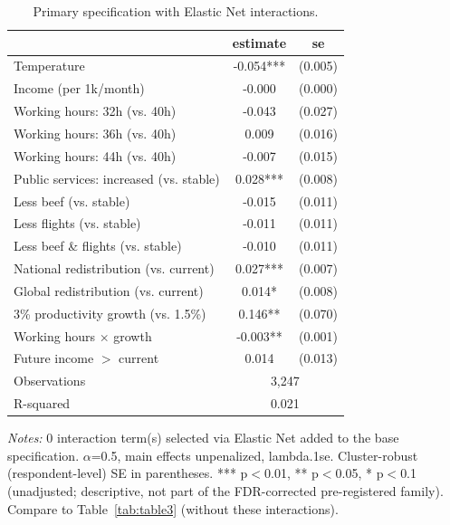 \begin{table}[H]
    \centering
    \caption{Primary specification with Elastic Net interactions.}
    \begin{tabular}{ l c c }
\hline \hline
 & estimate & se \\
\hline
\hspace{0.05cm} Temperature & -0.054*** & (0.005) \\
\hspace{0.05cm} Income (per 1k/month) & -0.000 & (0.000) \\
\hspace{0.05cm} Working hours: 32h (vs. 40h) & -0.043 & (0.027) \\
\hspace{0.05cm} Working hours: 36h (vs. 40h) & 0.009 & (0.016) \\
\hspace{0.05cm} Working hours: 44h (vs. 40h) & -0.007 & (0.015) \\
\hspace{0.05cm} Public services: increased (vs. stable) & 0.028*** & (0.008) \\
\hspace{0.05cm} Less beef (vs. stable) & -0.015 & (0.011) \\
\hspace{0.05cm} Less flights (vs. stable) & -0.011 & (0.011) \\
\hspace{0.05cm} Less beef \& flights (vs. stable) & -0.010 & (0.011) \\
\hspace{0.05cm} National redistribution (vs. current) & 0.027*** & (0.007) \\
\hspace{0.05cm} Global redistribution (vs. current) & 0.014* & (0.008) \\
\hspace{0.05cm} 3\% productivity growth (vs. 1.5\%) & 0.146** & (0.070) \\
\hspace{0.05cm} Working hours $\times$ growth & -0.003** & (0.001) \\
\hspace{0.05cm} Future income $>$ current & 0.014 & (0.013) \\
\hline
\hspace{0.05cm} Observations & \multicolumn{2}{c}{3,247} \\
\hspace{0.05cm} R-squared & \multicolumn{2}{c}{0.021} \\
\hline \hline
\end{tabular}
\begin{tablenotes}
\small
\item \textit{Notes:} 0 interaction term(s) selected via Elastic Net added to the base specification. $\alpha$=0.5, main effects unpenalized, lambda.1se. Cluster-robust (respondent-level) SE in parentheses. *** p$<$0.01, ** p$<$0.05, * p$<$0.1 (unadjusted; descriptive, not part of the FDR-corrected pre-registered family). Compare to Table~\ref{tab:table3} (without these interactions).
\end{tablenotes}
    \label{tab:table7}
\end{table}
